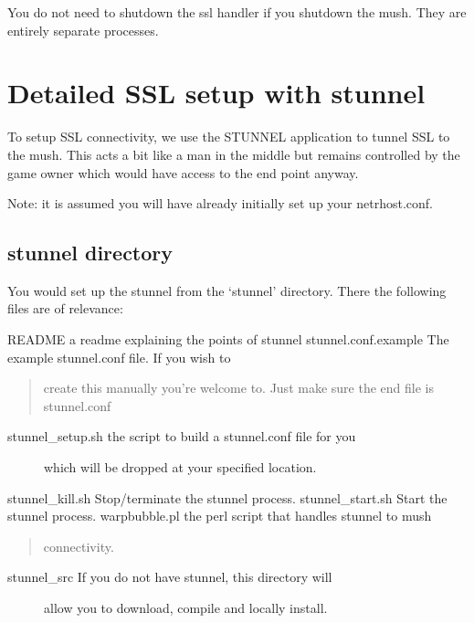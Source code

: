 \documentclass[letterpaper,10pt,english]{sphinxmanual}
\begin{document}
\sphinxAtStartPar
You do not need to shutdown the ssl handler if you shutdown the mush.  They
are entirely separate processes.


\section{Detailed SSL setup with stunnel}
\label{\detokenize{14-ssl:detailed-ssl-setup-with-stunnel}}
\sphinxAtStartPar
To setup SSL connectivity, we use the STUNNEL application to tunnel SSL to
the mush.  This acts a bit like a man in the middle but remains controlled
by the game owner which would have access to the end point anyway.

\sphinxAtStartPar
Note: it is assumed you will have already initially set up your netrhost.conf.


\subsection{stunnel directory}
\label{\detokenize{14-ssl:stunnel-directory}}
\sphinxAtStartPar
You would set up the stunnel from the ‘stunnel’ directory.  There the following
files are of relevance:

\sphinxAtStartPar
README                     \textendash{} a readme explaining the points of stunnel
stunnel.conf.example       \textendash{} The example stunnel.conf file.  If you wish to
\begin{quote}

\sphinxAtStartPar
create this manually you’re welcome to.  Just
make sure the end file is stunnel.conf
\end{quote}
\begin{description}
\item[{stunnel\_setup.sh           \textendash{} the script to build a stunnel.conf file for you}] \leavevmode
\sphinxAtStartPar
which will be dropped at your specified location.

\end{description}

\sphinxAtStartPar
stunnel\_kill.sh            \textendash{} Stop/terminate the stunnel process.
stunnel\_start.sh           \textendash{} Start the stunnel process.
warpbubble.pl              \textendash{} the perl script that handles stunnel to mush
\begin{quote}

\sphinxAtStartPar
connectivity.
\end{quote}
\begin{description}
\item[{stunnel\_src                \textendash{} If you do not have stunnel, this directory will}] \leavevmode
\sphinxAtStartPar
allow you to download, compile and locally install.

\end{description}
\end{document}
